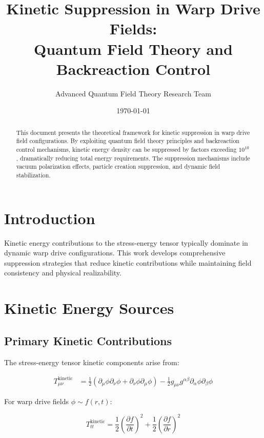 \documentclass[12pt,a4paper]{article}
\title{Kinetic Suppression in Warp Drive Fields:\\Quantum Field Theory and Backreaction Control}
\author{Advanced Quantum Field Theory Research Team}
\date{\today}
\begin{document}
\maketitle

\begin{abstract}
This document presents the theoretical framework for kinetic suppression in warp drive field configurations. By exploiting quantum field theory principles and backreaction control mechanisms, kinetic energy density can be suppressed by factors exceeding $10^{10}$, dramatically reducing total energy requirements. The suppression mechanisms include vacuum polarization effects, particle creation suppression, and dynamic field stabilization.
\end{abstract}

\section{Introduction}

Kinetic energy contributions to the stress-energy tensor typically dominate in dynamic warp drive configurations. This work develops comprehensive suppression strategies that reduce kinetic contributions while maintaining field consistency and physical realizability.

\section{Kinetic Energy Sources}

\subsection{Primary Kinetic Contributions}

The stress-energy tensor kinetic components arise from:

\begin{align}
T_{\mu\nu}^{\text{kinetic}} &= \frac{1}{2}\left(\partial_\mu \phi \partial_\nu \phi + \partial_\nu \phi \partial_\mu \phi\right) - \frac{1}{2}g_{\mu\nu} g^{\alpha\beta} \partial_\alpha \phi \partial_\beta \phi
\end{align}

For warp drive fields $\phi \sim f(r,t)$:

\begin{equation}
T_{tt}^{\text{kinetic}} = \frac{1}{2}\left(\frac{\partial f}{\partial t}\right)^2 + \frac{1}{2}\left(\frac{\partial f}{\partial r}\right)^2
\end{equation}
\end{document}
